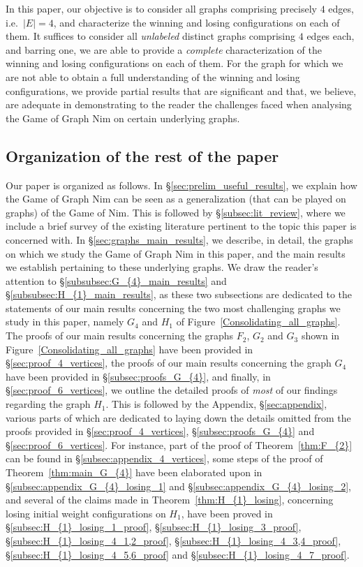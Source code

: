 \documentclass[11pt,reqno]{amsart}
\theoremstyle{definition}
\theoremstyle{definition}
\begin{document}
In this paper, our objective is to consider all graphs comprising precisely $4$ edges, i.e.\ $|E|=4$, and characterize the winning and losing configurations on each of them. It suffices to consider all \emph{unlabeled} distinct graphs comprising $4$ edges each, and barring one, we are able to provide a \emph{complete} characterization of the winning and losing configurations on each of them. For the graph for which we are not able to obtain a full understanding of the winning and losing configurations, we provide partial results that are significant and that, we believe, are adequate in demonstrating to the reader the challenges faced when analysing the Game of Graph Nim on certain underlying graphs.

\subsection{Organization of the rest of the paper}
Our paper is organized as follows. In \S\ref{sec:prelim_useful_results}, we explain how the Game of Graph Nim can be seen as a generalization (that can be played on graphs) of the Game of Nim. This is followed by \S\ref{subsec:lit_review}, where we include a brief survey of the existing literature pertinent to the topic this paper is concerned with. In \S\ref{sec:graphs_main_results}, we describe, in detail, the graphs on which we study the Game of Graph Nim in this paper, and the main results we establish pertaining to these underlying graphs. We draw the reader's attention to \S\ref{subsubsec:G_{4}_main_results} and \S\ref{subsubsec:H_{1}_main_results}, as these two subsections are dedicated to the statements of our main results concerning the two most challenging graphs we study in this paper, namely $G_{4}$ and $H_{1}$ of Figure~\ref{Consolidating_all_graphs}. The proofs of our main results concerning the graphs $F_{2}$, $G_{2}$ and $G_{3}$ shown in Figure~\ref{Consolidating_all_graphs} have been provided in \S\ref{sec:proof_4_vertices}, the proofs of our main results concerning the graph $G_{4}$ have been provided in \S\ref{subsec:proofs_G_{4}}, and finally, in \S\ref{sec:proof_6_vertices}, we outline the detailed proofs of \emph{most} of our findings regarding the graph $H_{1}$. This is followed by the Appendix, \S\ref{sec:appendix}, various parts of which are dedicated to laying down the details omitted from the proofs provided in \S\ref{sec:proof_4_vertices}, \S\ref{subsec:proofs_G_{4}} and \S\ref{sec:proof_6_vertices}. For instance, part of the proof of Theorem~\ref{thm:F_{2}} can be found in \S\ref{subsec:appendix_4_vertices}, some steps of the proof of Theorem~\ref{thm:main_G_{4}} have been elaborated upon in \S\ref{subsec:appendix_G_{4}_losing_1} and \S\ref{subsec:appendix_G_{4}_losing_2}, and several of the claims made in Theorem~\ref{thm:H_{1}_losing}, concerning losing initial weight configurations on $H_{1}$, have been proved in \S\ref{subsec:H_{1}_losing_1_proof}, \S\ref{subsec:H_{1}_losing_3_proof}, \S\ref{subsec:H_{1}_losing_4_1,2_proof}, \S\ref{subsec:H_{1}_losing_4_3,4_proof}, \S\ref{subsec:H_{1}_losing_4_5,6_proof} and \S\ref{subsec:H_{1}_losing_4_7_proof}.
\end{document}
